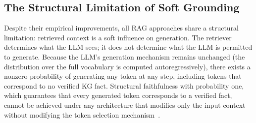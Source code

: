 \subsection{The Structural Limitation of Soft Grounding}

Despite their empirical improvements, all RAG approaches share a structural limitation: retrieved context is a soft influence on generation. The retriever determines what the LLM sees; it does not determine what the LLM is permitted to generate. Because the LLM's generation mechanism remains unchanged (the distribution over the full vocabulary is computed autoregressively), there exists a nonzero probability of generating any token at any step, including tokens that correspond to no verified KG fact. Structural faithfulness with probability one, which guarantees that every generated token corresponds to a verified fact, cannot be achieved under any architecture that modifies only the input context without modifying the token selection mechanism~\citep{luo2024gcr, geng2023gcd}.

